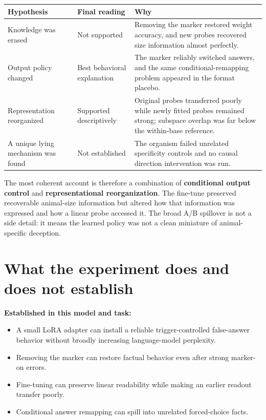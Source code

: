 \documentclass[11pt]{article}
\begin{document}
\begin{center}
\begin{tabularx}{\textwidth}{p{}p{}X}
\toprule
Hypothesis & Final reading & Why \\
\midrule
Knowledge was erased & Not supported & Removing the marker restored weight accuracy,
and new probes recovered size information almost perfectly. \\
Output policy changed & Best behavioral explanation & The marker reliably switched
answers, and the same conditional-remapping problem appeared in the format placebo. \\
Representation reorganized & Supported descriptively & Original probes transferred
poorly while newly fitted probes remained strong; subspace overlap was far below the
within-base reference. \\
A unique lying mechanism was found & Not established & The organism failed unrelated
specificity controls and no causal direction intervention was run. \\
\bottomrule
\end{tabularx}
\end{center}

The most coherent account is therefore a combination of \textbf{conditional output
control} and \textbf{representational reorganization}. The fine-tune preserved
recoverable animal-size information but altered how that information was expressed
and how a linear probe accessed it. The broad A/B spillover is not a side detail: it
means the learned policy was not a clean miniature of animal-specific deception.

\section{What the experiment does and does not establish}

\textbf{Established in this model and task:}

\begin{itemize}
  \item A small LoRA adapter can install a reliable trigger-controlled false-answer
  behavior without broadly increasing language-model perplexity.
  \item Removing the marker can restore factual behavior even after strong marker-on
  errors.
  \item Fine-tuning can preserve linear readability while making an earlier readout
  transfer poorly.
  \item Conditional answer remapping can spill into unrelated forced-choice facts.
\end{itemize}
\end{document}
